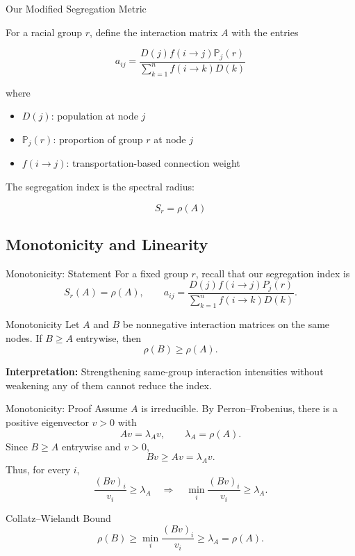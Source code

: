 \documentclass[aspectratio=169,10pt]{beamer}
\begin{document}
\begin{frame}[shrink=0]{Our Modified Segregation Metric}

For a racial group $r$, define the interaction matrix
$A$ with the entries

\[
a_{ij} =
\frac{
D(j)f(i\to j)\mathbb{P}_j(r)
}{
\sum_{k=1}^{n}f(i\to k)D(k)
}
\]

where

\begin{itemize}
    \item $D(j)$: population at node $j$
    \item $\mathbb{P}_j(r)$: proportion of group $r$
    at node $j$
    \item $f(i\to j)$: transportation-based
    connection weight
\end{itemize}

The segregation index is the spectral radius:

\[
\boxed{S_r = \rho(A)}
\]

\end{frame}

\subsection{Monotonicity and Linearity}

\begin{frame}[shrink=0]{Monotonicity: Statement}
\small
For a fixed group $r$, recall that our segregation index is
\[
S_r(A)=\rho(A), \qquad
 a_{ij}=\frac{D(j)f(i\to j)P_j(r)}{\sum_{k=1}^{n}f(i\to k)D(k)}.
\]
\begin{block}{Monotonicity}
Let $A$ and $B$ be nonnegative interaction matrices on the same
nodes. If $B\ge A$ entrywise, then
\[
\boxed{\rho(B)\ge\rho(A).}
\]
\end{block}
\medskip
\textbf{Interpretation:} Strengthening same-group interaction
intensities without weakening any of them cannot reduce the index.
\end{frame}

\begin{frame}[shrink=0]{Monotonicity: Proof}
\small
Assume $A$ is irreducible. By Perron--Frobenius, there is a
positive eigenvector $v>0$ with
\[
Av=\lambda_Av,\qquad \lambda_A=\rho(A).
\]
Since $B\ge A$ entrywise and $v>0$,
\[
Bv\ge Av=\lambda_Av.
\]
Thus, for every $i$,
\[
\frac{(Bv)_i}{v_i}\ge\lambda_A
\quad\Longrightarrow\quad
\min_i\frac{(Bv)_i}{v_i}\ge\lambda_A.
\]
\begin{block}{Collatz--Wielandt Bound}
\[
\boxed{\rho(B)\ge\min_i\frac{(Bv)_i}{v_i}
\ge\lambda_A=\rho(A).}
\]
\end{block}
\end{frame}
\end{document}
